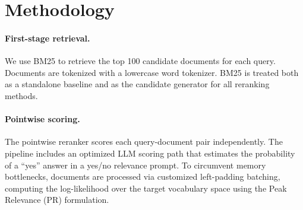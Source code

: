 \documentclass[11pt]{article}
\begin{document}
\section{Methodology}

\paragraph{First-stage retrieval.}
We use BM25 to retrieve the top 100 candidate documents for each query. Documents are tokenized with a lowercase word tokenizer. BM25 is treated both as a standalone baseline and as the candidate generator for all reranking methods.

\paragraph{Pointwise scoring.}
The pointwise reranker scores each query-document pair independently. The pipeline includes an optimized LLM scoring path that estimates the probability of a ``yes'' answer in a yes/no relevance prompt. To circumvent memory bottlenecks, documents are processed via customized left-padding batching, computing the log-likelihood over the target vocabulary space using the Peak Relevance (PR) formulation.
\end{document}
